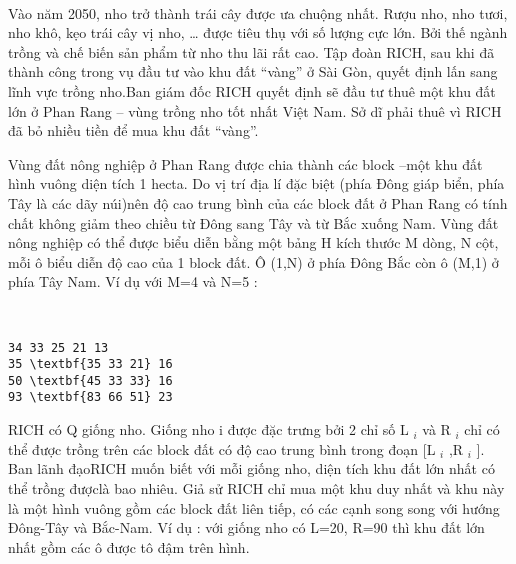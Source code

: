  

Vào năm 2050, nho trở thành trái cây được ưa chuộng nhất. Rượu nho, nho tươi, nho khô, kẹo trái cây vị nho, … được tiêu thụ với số lượng cực lớn. Bởi thế ngành trồng và chế biến sản phẩm từ nho thu lãi rất cao. Tập đoàn RICH, sau khi đã thành công trong vụ đầu tư vào khu đất “vàng” ở Sài Gòn, quyết định lấn sang lĩnh vực trồng nho.Ban giám đốc RICH quyết định sẽ đầu tư thuê một khu đất lớn ở Phan Rang – vùng trồng nho tốt nhất Việt Nam. Sở dĩ phải thuê vì RICH đã bỏ nhiều tiền để mua khu đất “vàng”.

Vùng đất nông nghiệp ở Phan Rang được chia thành các block –một khu đất hình vuông diện tích 1 hecta. Do vị trí địa lí đặc biệt (phía Đông giáp biển, phía Tây là các dãy núi)nên độ cao trung bình của các block đất ở Phan Rang có tính chất không giảm theo chiều từ Đông sang Tây và từ Bắc xuống Nam. Vùng đất nông nghiệp có thể được biểu diễn bằng một bảng H kích thước M dòng, N cột, mỗi ô biểu diễn độ cao của 1 block đất. Ô (1,N) ở phía Đông Bắc còn ô (M,1) ở phía Tây Nam. Ví dụ với M=4 và N=5 :

 
\begin{verbatim}
34 33 25 21 13
35 \textbf{35 33 21} 16
50 \textbf{45 33 33} 16
93 \textbf{83 66 51} 23

\end{verbatim}

RICH có Q giống nho. Giống nho i được đặc trưng bởi 2 chỉ số L $_ i $ và R $_ i $ chỉ có thể được trồng trên các block đất có độ cao trung bình trong đoạn [L $_ i $ ,R $_ i $ ]. Ban lãnh đạoRICH muốn biết với mỗi giống nho, diện tích khu đất lớn nhất có thể trồng đượclà bao nhiêu. Giả sử RICH chỉ mua một khu duy nhất và khu này là một hình vuông gồm các block đất liên tiếp, có các cạnh song song với hướng Đông-Tây và Bắc-Nam. Ví dụ : với giống nho có L=20, R=90 thì khu đất lớn nhất gồm các ô được tô đậm trên hình.

\